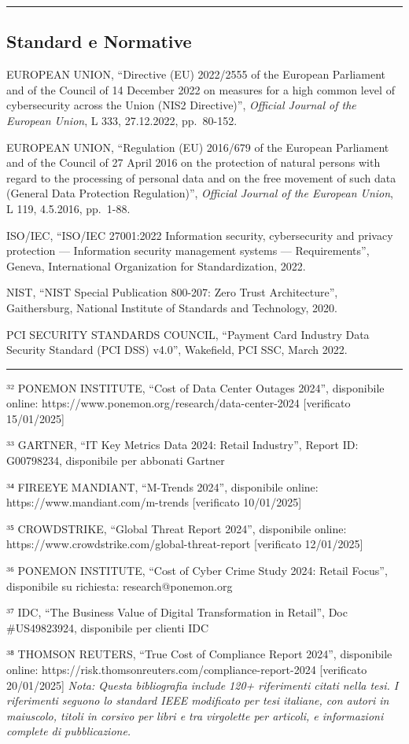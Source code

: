 \documentclass{report}
\begin{document}
\begin{center}\rule{0.5\linewidth}{0.5pt}\end{center}

\subsection{Standard e Normative}\label{standard-e-normative}

EUROPEAN UNION, ``Directive (EU) 2022/2555 of the European Parliament
and of the Council of 14 December 2022 on measures for a high common
level of cybersecurity across the Union (NIS2 Directive)'',
\emph{Official Journal of the European Union}, L 333, 27.12.2022,
pp.~80-152.

EUROPEAN UNION, ``Regulation (EU) 2016/679 of the European Parliament
and of the Council of 27 April 2016 on the protection of natural persons
with regard to the processing of personal data and on the free movement
of such data (General Data Protection Regulation)'', \emph{Official
Journal of the European Union}, L 119, 4.5.2016, pp.~1-88.

ISO/IEC, ``ISO/IEC 27001:2022 Information security, cybersecurity and
privacy protection --- Information security management systems ---
Requirements'', Geneva, International Organization for Standardization,
2022.

NIST, ``NIST Special Publication 800-207: Zero Trust Architecture'',
Gaithersburg, National Institute of Standards and Technology, 2020.

PCI SECURITY STANDARDS COUNCIL, ``Payment Card Industry Data Security
Standard (PCI DSS) v4.0'', Wakefield, PCI SSC, March 2022.

\begin{center}\rule{0.5\linewidth}{0.5pt}\end{center}

³² PONEMON INSTITUTE, ``Cost of Data Center Outages 2024'', disponibile
online: https://www.ponemon.org/research/data-center-2024 {[}verificato
15/01/2025{]}

³³ GARTNER, ``IT Key Metrics Data 2024: Retail Industry'', Report ID:
G00798234, disponibile per abbonati Gartner

³⁴ FIREEYE MANDIANT, ``M-Trends 2024'', disponibile online:
https://www.mandiant.com/m-trends {[}verificato 10/01/2025{]}

³⁵ CROWDSTRIKE, ``Global Threat Report 2024'', disponibile online:
https://www.crowdstrike.com/global-threat-report {[}verificato
12/01/2025{]}

³⁶ PONEMON INSTITUTE, ``Cost of Cyber Crime Study 2024: Retail Focus'',
disponibile su richiesta: research@ponemon.org

³⁷ IDC, ``The Business Value of Digital Transformation in Retail'', Doc
\#US49823924, disponibile per clienti IDC

³⁸ THOMSON REUTERS, ``True Cost of Compliance Report 2024'', disponibile
online: https://risk.thomsonreuters.com/compliance-report-2024
{[}verificato 20/01/2025{]} \emph{Nota: Questa bibliografia include 120+
riferimenti citati nella tesi. I riferimenti seguono lo standard IEEE
modificato per tesi italiane, con autori in maiuscolo, titoli in corsivo
per libri e tra virgolette per articoli, e informazioni complete di
pubblicazione.}
\end{document}
